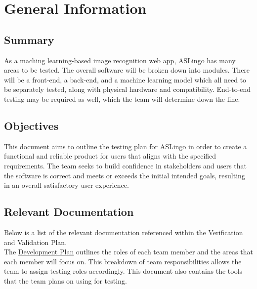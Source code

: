 \documentclass[12pt, titlepage]{article}
\begin{document}
\section{General Information}

\subsection{Summary}

As a maching learning-based image recognition web app, ASLingo has many areas to be tested. The overall software will be broken down into modules. There will be a front-end, a back-end, and a machine learning model which all need to be separately tested, along with physical hardware and compatibility. End-to-end testing may be required as well, which the team will determine down the line.

\subsection{Objectives}

This document aims to outline the testing plan for ASLingo in order to create a functional and reliable product for users that aligns with the specified requirements. The team seeks to build confidence in stakeholders and users that the software is correct and meets or exceeds the initial intended goals, resulting in an overall satisfactory user experience.

\subsection{Relevant Documentation} 

Below is a list of the relevant documentation referenced within the Verification and Validation Plan.\\


\noindent The \href{https://github.com/stanreee/sign-language-learning/blob/main/docs/DevelopmentPlan/DevelopmentPlan.pdf}{Development Plan} outlines the roles of each team member and the areas that each member will focus on. This breakdown of team responsibilities allows the team to assign testing roles accordingly. This document also contains the tools that the team plans on using for testing.\\
\end{document}

